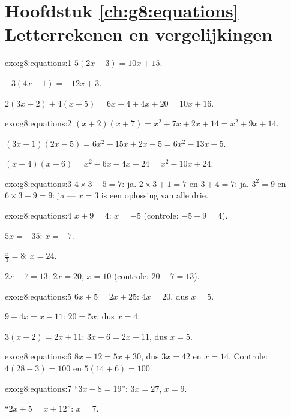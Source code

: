 \section*{Hoofdstuk \ref{ch:g8:equations} --- Letterrekenen en vergelijkingen}

\begin{solution}{exo:g8:equations:1}
$5(2x + 3) = 10x + 15$.

$-3(4x - 1) = -12x + 3$.

$2(3x - 2) + 4(x + 5) = 6x - 4 + 4x + 20 = 10x + 16$.
\end{solution}

\begin{solution}{exo:g8:equations:2}
$(x+2)(x+7) = x^2 + 7x + 2x + 14 = x^2 + 9x + 14$.

$(3x+1)(2x-5) = 6x^2 - 15x + 2x - 5 = 6x^2 - 13x - 5$.

$(x-4)(x-6) = x^2 - 6x - 4x + 24 = x^2 - 10x + 24$.
\end{solution}

\begin{solution}{exo:g8:equations:3}
$4 \times 3 - 5 = 7$: ja. \quad
$2 \times 3 + 1 = 7$ en $3 + 4 = 7$: ja. \quad
$3^2 = 9$ en $6 \times 3 - 9 = 9$: ja --- $x = 3$ is een oplossing van alle
drie.
\end{solution}

\begin{solution}{exo:g8:equations:4}
$x + 9 = 4$: $x = -5$ (controle: $-5 + 9 = 4$).

$5x = -35$: $x = -7$.

$\frac x3 = 8$: $x = 24$.

$2x - 7 = 13$: $2x = 20$, $x = 10$ (controle: $20 - 7 = 13$).
\end{solution}

\begin{solution}{exo:g8:equations:5}
$6x + 5 = 2x + 25$: $4x = 20$, dus $x = 5$.

$9 - 4x = x - 11$: $20 = 5x$, dus $x = 4$.

$3(x + 2) = 2x + 11$: $3x + 6 = 2x + 11$, dus $x = 5$.
\end{solution}

\begin{solution}{exo:g8:equations:6}
$8x - 12 = 5x + 30$, dus $3x = 42$ en $x = 14$. Controle:
$4(28 - 3) = 100$ en $5(14 + 6) = 100$.
\end{solution}

\begin{solution}{exo:g8:equations:7}
``$3x - 8 = 19$'': $3x = 27$, $x = 9$.

``$2x + 5 = x + 12$'': $x = 7$.
\end{solution}

